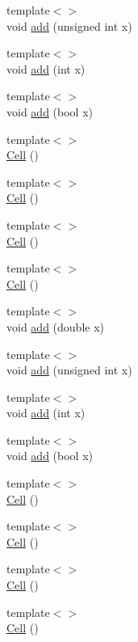 \begin{DoxyCompactItemize}
\item 
{\footnotesize template$<$$>$ }\\void \hyperlink{class_cell_ae22060201cf692bbf219827453d0acd2}{add} (unsigned int x)
\item 
{\footnotesize template$<$$>$ }\\void \hyperlink{class_cell_a74cb069c7341de33354c396465818c2f}{add} (int x)
\item 
{\footnotesize template$<$$>$ }\\void \hyperlink{class_cell_a0da6d3d39069cc22486442cc51c7685c}{add} (bool x)
\item 
{\footnotesize template$<$$>$ }\\\hyperlink{class_cell_a5ecdaddaf4661a9a8fe6f0ed61595847}{Cell} ()
\item 
{\footnotesize template$<$$>$ }\\\hyperlink{class_cell_aa102374546b7479f50a8eeec80ec2764}{Cell} ()
\item 
{\footnotesize template$<$$>$ }\\\hyperlink{class_cell_a7019dc2ccc1e14bd17aa9f03b377a199}{Cell} ()
\item 
{\footnotesize template$<$$>$ }\\\hyperlink{class_cell_aef4b64101b33e2349ceea132b962d137}{Cell} ()
\item 
{\footnotesize template$<$$>$ }\\void \hyperlink{class_cell_a64d4b92f322ccb8cfbad53f816d2caf8}{add} (double x)
\item 
{\footnotesize template$<$$>$ }\\void \hyperlink{class_cell_ae22060201cf692bbf219827453d0acd2}{add} (unsigned int x)
\item 
{\footnotesize template$<$$>$ }\\void \hyperlink{class_cell_a74cb069c7341de33354c396465818c2f}{add} (int x)
\item 
{\footnotesize template$<$$>$ }\\void \hyperlink{class_cell_a0da6d3d39069cc22486442cc51c7685c}{add} (bool x)
\item 
{\footnotesize template$<$$>$ }\\\hyperlink{class_cell_a5ecdaddaf4661a9a8fe6f0ed61595847}{Cell} ()
\item 
{\footnotesize template$<$$>$ }\\\hyperlink{class_cell_aa102374546b7479f50a8eeec80ec2764}{Cell} ()
\item 
{\footnotesize template$<$$>$ }\\\hyperlink{class_cell_a7019dc2ccc1e14bd17aa9f03b377a199}{Cell} ()
\item 
{\footnotesize template$<$$>$ }\\\hyperlink{class_cell_aef4b64101b33e2349ceea132b962d137}{Cell} ()
\end{DoxyCompactItemize}
